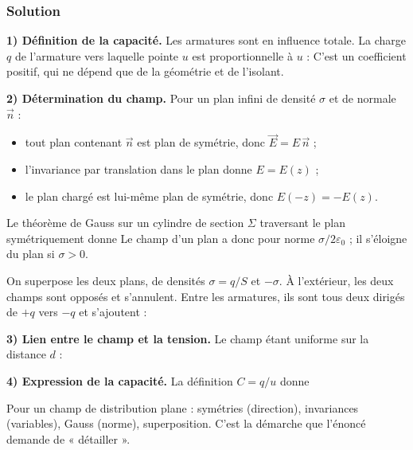 \documentclass[11pt,a4paper]{article}
\providecommand{\tightlist}{\setlength{\itemsep}{0pt}\setlength{\parskip}{0pt}}
\newcommand{\equationajustee}[1]{%
  \sbox{\boiteequation}{$\displaystyle #1$}%
  \ifdim\wd\boiteequation>\linewidth
    \[\resizebox{\linewidth}{!}{\usebox{\boiteequation}}\]%
  \else
    \[#1\]%
  \fi}
\begin{document}
\hypertarget{solution-1}{%
\subsubsection{Solution}\label{solution-1}}

\textbf{1) Définition de la capacité.} Les armatures sont en influence totale. La charge \(q\) de l'armature vers laquelle pointe \(u\) est proportionnelle à \(u\) :
\equationajustee{\boxed{C=\frac{q}{u}}}
C'est un coefficient positif, qui ne dépend que de la géométrie et de l'isolant.

\textbf{2) Détermination du champ.} Pour un plan infini de densité \(\sigma\) et de normale \(\vec n\) :

\begin{itemize}
\tightlist
\item
  tout plan contenant \(\vec n\) est plan de symétrie, donc \(\vec E=E\,\vec n\) ;
\item
  l'invariance par translation dans le plan donne \(E=E(z)\) ;
\item
  le plan chargé est lui-même plan de symétrie, donc \(E(-z)=-E(z)\).
\end{itemize}

Le théorème de Gauss sur un cylindre de section \(\Sigma\) traversant le plan symétriquement donne
\equationajustee{2E(z)\Sigma=\frac{\sigma\Sigma}{\varepsilon_0}}
Le champ d'un plan a donc pour norme \(\sigma/2\varepsilon_0\) ; il s'éloigne du plan si \(\sigma>0\).

On superpose les deux plans, de densités \(\sigma=q/S\) et \(-\sigma\). À l'extérieur, les deux champs sont opposés et s'annulent. Entre les armatures, ils sont tous deux dirigés de \(+q\) vers \(-q\) et s'ajoutent :
\equationajustee{\boxed{\vec E=\frac{q}{\varepsilon_0S}\,\vec u_{+\to-}}}

\textbf{3) Lien entre le champ et la tension.} Le champ étant uniforme sur la distance \(d\) :
\equationajustee{\begin{aligned}
u&=\int_+^-\vec E\cdot\mathrm d\vec\ell\\
&=Ed\\
&=\frac{qd}{\varepsilon_0S}
\end{aligned}}

\textbf{4) Expression de la capacité.} La définition \(C=q/u\) donne
\equationajustee{\boxed{C=\frac{\varepsilon_0S}{d}}}

\begin{methode}

Pour un champ de distribution plane : symétries (direction), invariances (variables), Gauss (norme), superposition. C'est la démarche que l'énoncé demande de « détailler ».

\end{methode}
\end{document}
